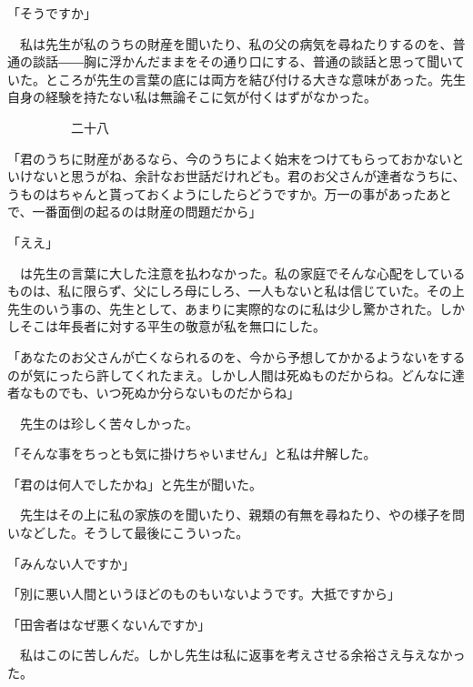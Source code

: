 \documentclass[a4j,onecolumn]{tarticle}
\begin{document}
「そうですか」\par{}
　私は先生が私のうちの財産を聞いたり、\hbox{}私の父の病気を尋ねたりするのを、\hbox{}普通の談話――胸に浮かんだままをその通り口にする、\hbox{}普通の談話と思って聞いていた。\hbox{}ところが先生の言葉の底には両方を結び付ける大きな意味があった。\hbox{}先生自身の経験を持たない私は無論そこに気が付くはずがなかった。\hbox{}\par{}\par{}　　　　　二十八
\par{}
「君のうちに財産があるなら、\hbox{}今のうちによく始末をつけてもらっておかないといけないと思うがね、\hbox{}余計なお世話だけれども。\hbox{}君のお父さんが達者なうちに、\hbox{}うものはちゃんと貰っておくようにしたらどうですか。\hbox{}万一の事があったあとで、\hbox{}一番面倒の起るのは財産の問題だから」\par{}
「ええ」\par{}
　は先生の言葉に大した注意を払わなかった。\hbox{}私の家庭でそんな心配をしているものは、\hbox{}私に限らず、\hbox{}父にしろ母にしろ、\hbox{}一人もないと私は信じていた。\hbox{}その上先生のいう事の、\hbox{}先生として、\hbox{}あまりに実際的なのに私は少し驚かされた。\hbox{}しかしそこは年長者に対する平生の敬意が私を無口にした。\hbox{}\par{}
「あなたのお父さんが亡くなられるのを、\hbox{}今から予想してかかるようないをするのが気にったら許してくれたまえ。\hbox{}しかし人間は死ぬものだからね。\hbox{}どんなに達者なものでも、\hbox{}いつ死ぬか分らないものだからね」\par{}
　先生のは珍しく苦々しかった。\hbox{}\par{}
「そんな事をちっとも気に掛けちゃいません」と私は弁解した。\hbox{}\par{}
「君のは何人でしたかね」と先生が聞いた。\hbox{}\par{}
　先生はその上に私の家族のを聞いたり、\hbox{}親類の有無を尋ねたり、\hbox{}やの様子を問いなどした。\hbox{}そうして最後にこういった。\hbox{}\par{}
「みんない人ですか」\par{}
「別に悪い人間というほどのものもいないようです。\hbox{}大抵ですから」\par{}
「田舎者はなぜ悪くないんですか」\par{}
　私はこのに苦しんだ。\hbox{}しかし先生は私に返事を考えさせる余裕さえ与えなかった。\hbox{}\par{}
\end{document}
